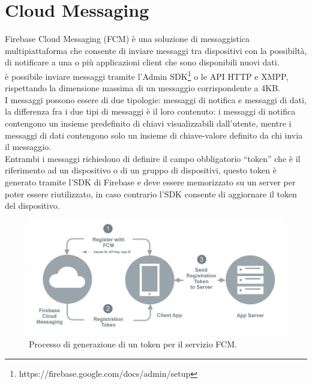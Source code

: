 \newpage
\section{Cloud Messaging}                 %
Firebase Cloud Messaging (FCM) è una soluzione di messaggistica multipiattaforma che consente di inviare messaggi tra dispositivi con la possibiltà, di notificare a una o più applicazioni client che sono disponibili nuovi dati.\\
è possibile inviare messaggi tramite l'Admin SDK\footnote{https://firebase.google.com/docs/admin/setup} o le API HTTP e XMPP, rispettando la dimensione massima di un messaggio corrispondente a 4KB.\\
I messaggi possono essere di due tipologie: messaggi di notifica e messaggi di dati, la differenza fra i due tipi di messaggi è il loro contenuto: i messaggi di notifica contengono un insieme predefinito di chiavi visualizzabili dall'utente, mentre i messaggi di dati contengono solo un insieme di chiave-valore definito da chi invia il messaggio.\\
Entrambi i messaggi richiedono di definire il campo obbligatorio ``token'' che è il riferimento ad un dispositivo o di un gruppo di dispositivi, questo token è generato tramite l'SDK di Firebase e deve essere memorizzato su un server per poter essere riutilizzato, in caso contrario l'SDK consente di aggiornare il token del dispositivo.

\begin{figure}[!hb]
  \centering
  \includegraphics[width=1\textwidth]{immagini/fcm_token.png}
  \caption{Processo di generazione di un token per il servizio FCM.}
  \label{fig:Processo di generazione di un token per il servizio FCM}
\end{figure}

